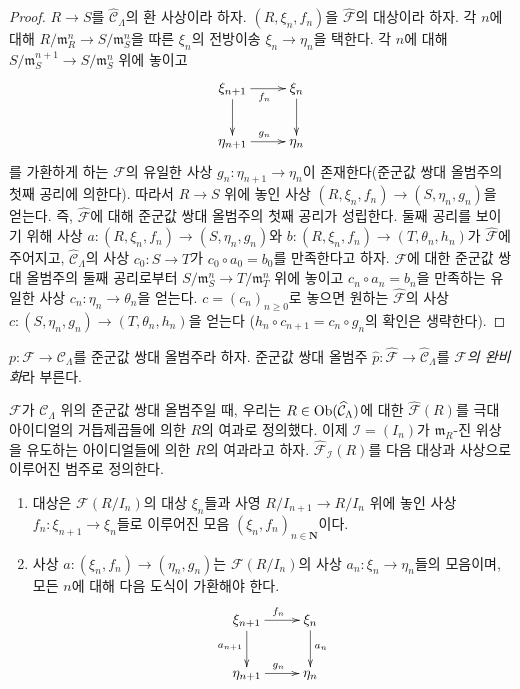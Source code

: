 \begin{proof}
$R \to S$를 $\widehat{\mathcal{C}}_\Lambda$의 환 사상이라 하자.
$(R, \xi_n, f_n)$을 $\widehat{\mathcal{F}}$의 대상이라 하자.
각 $n$에 대해 $R/\mathfrak m_R^n \to S/\mathfrak m_S^n$을 따른
$\xi_n$의 전방이송 $\xi_n \to \eta_n$을 택한다. 각 $n$에 대해
$S/\mathfrak m_S^{n + 1} \to S/\mathfrak m_S^n$ 위에 놓이고
$$
\xymatrix{
\xi_{n + 1} \ar[d] \ar[r]_{f_n} & \xi_n \ar[d] \\
\eta_{n + 1} \ar[r]^{g_n} & \eta_n
}
$$
를 가환하게 하는 $\mathcal{F}$의 유일한 사상
$g_n : \eta_{n + 1} \to \eta_n$이 존재한다(준군값 쌍대
올범주의 첫째 공리에 의한다).%
따라서 $R \to S$ 위에 놓인 사상
$(R, \xi_n, f_n) \to (S, \eta_n, g_n)$을 얻는다. 즉,
$\widehat{\mathcal{F}}$에 대해 준군값 쌍대 올범주의 첫째 공리가
성립한다. 둘째 공리를 보이기 위해 사상
$a : (R, \xi_n, f_n) \to (S, \eta_n, g_n)$와
$b : (R, \xi_n, f_n) \to (T, \theta_n, h_n)$가
$\widehat{\mathcal{F}}$에 주어지고, $\widehat{\mathcal{C}}_\Lambda$의
사상 $c_0 : S \to T$가 $c_0 \circ a_0 = b_0$를 만족한다고 하자.
$\mathcal{F}$에 대한 준군값 쌍대 올범주의 둘째 공리로부터
$S/\mathfrak m_S^n \to T/\mathfrak m_T^n$ 위에 놓이고
$c_n \circ a_n = b_n$을 만족하는 유일한 사상
$c_n : \eta_n \to \theta_n$을 얻는다. $c = (c_n)_{n \geq 0}$로 놓으면
원하는 $\widehat{\mathcal{F}}$의 사상
$c : (S, \eta_n, g_n) \to (T, \theta_n, h_n)$을 얻는다
($h_n \circ c_{n + 1} = c_n \circ g_n$의 확인은 생략한다).
\end{proof}

\begin{definition}
\label{definition-completion}
$p : \mathcal{F} \to \mathcal{C}_\Lambda$를 준군값 쌍대
올범주라 하자. 준군값 쌍대 올범주
$\widehat{p} : \widehat{\mathcal  F} \to \widehat{\mathcal{C}}_\Lambda$를
{\it $\mathcal{F}$의 완비화}라 부른다.
\end{definition}

\noindent
$\mathcal{F}$가 $\mathcal C_\Lambda$ 위의 준군값 쌍대
올범주일 때, 우리는 $R \in \mathop{\mathrm{Ob}}\nolimits(\widehat{\mathcal{C}}_\Lambda)$에 대한
$\widehat{\mathcal{F}}(R)$를 극대 아이디얼의 거듭제곱들에 의한
$R$의 여과로 정의했다. 이제 $\mathcal{I} = (I_n)$가
$\mathfrak{m}_R$-진 위상을 유도하는 아이디얼들에 의한 $R$의
여과라고 하자. $\widehat{\mathcal{F}}_\mathcal{I}(R)$를 다음 대상과
사상으로 이루어진 범주로 정의한다.
\begin{enumerate}
\item 대상은 $\mathcal{F}(R/I_n)$의 대상 $\xi_n$들과 사영
$R/I_{n + 1} \to R/I_n$ 위에 놓인 사상
$f_n : \xi_{n + 1} \to \xi_n$들로 이루어진 모음
$(\xi_n, f_n)_{n \in \mathbf{N}}$이다.
\item 사상 $a : (\xi_n, f_n) \to (\eta_n, g_n)$는
$\mathcal{F}(R/I_n)$의 사상 $a_n : \xi_n \to \eta_n$들의 모음이며,
모든 $n$에 대해 다음 도식이 가환해야 한다.
$$
\xymatrix{
\xi_{n + 1} \ar[r]^{f_n} \ar[d]_{a_{n + 1}} & \xi_n \ar[d]^{a_n} \\
\eta_{n + 1} \ar[r]^{g_n} & \eta_n
}
$$
\end{enumerate}

